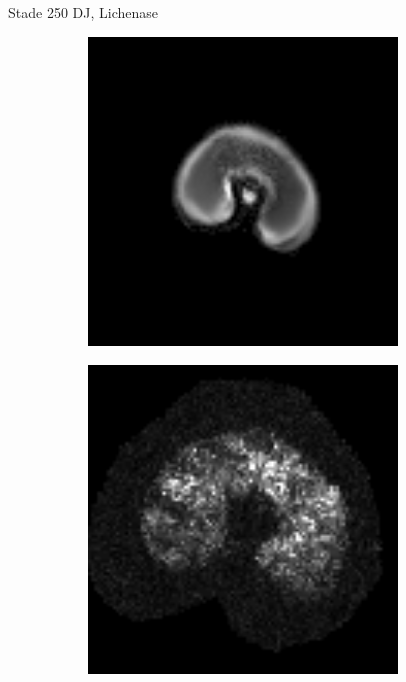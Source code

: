 \documentclass[10pt]{beamer}
\begin{document}
\begin{frame}{Stade 250 DJ, Lichenase}
  \begin{figure}[ht]
    \centering
    \begin{subfigure}[t]{0.33\textwidth}
      \centering
      \includegraphics[width=0.9\textwidth]{fig/stats_250Xyl_density_irm}
    \end{subfigure}%
    \begin{subfigure}[t]{0.33\textwidth}
      \centering
      \includegraphics[width=0.9\textwidth]{fig/stats_250Lich_t2}
    \end{subfigure}%
    
  \end{figure}
  
\end{frame}
\end{document}
